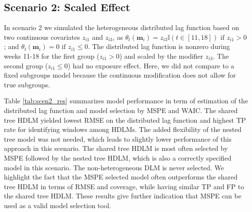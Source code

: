 \documentclass[12pt]{article}
\begin{document}
\subsection{Scenario 2: Scaled Effect}

In scenario 2 we simulated the heterogeneous distributed lag function based on two continuous covariates $z_{i1}$ and $z_{i3}$, as $\theta_t(\mathbf{m}_i)= z_{i3}\mathbb{I}(t\in[11,18])\text{ if }z_{i1}>0$; and $\theta_t(\mathbf{m}_i)= 0\text{ if }z_{i1}\leq 0$. The distributed lag function is nonzero during weeks 11-18 for the first group ($z_{i1}>0$) and scaled by the modifier $z_{i3}$. The second group ($z_{i1}\leq 0$) had no exposure effect. Here, we did not compare to a fixed subgroups model because the continuous modification does not allow for true subgroups.

Table \ref{tab:scen2_res} summarizes model performance in term of estimation of the distributed lag function and model selection by MSPE and WAIC. The shared tree HDLM yielded lowest RMSE on the distributed lag function and highest TP rate for identifying windows among HDLMs. The added flexibility of the nested tree model was not needed, which leads to slightly lower performance of this approach in this scenario. The shared tree HDLM is most often selected by MSPE followed by the nested tree HDLM, which is also a correctly specified model in this scenario. The non-heterogeneous DLM is never selected. We highlight the fact that the MSPE selected model often outperforms the shared tree HDLM in terms of RMSE and coverage, while having similar TP and FP to the shared tree HDLM. These results give further indication that MSPE can be used as a valid model selection tool.
\end{document}
